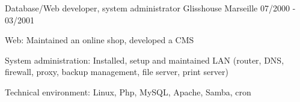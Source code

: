 \begin{cventries}
  \cventry
    {Database/Web developer, system administrator}
    {Glisshouse}
    {Marseille}
    {07/2000 - 03/2001}
    {
      \begin{cvitems}
        \item {Web: Maintained an online shop, developed a CMS}
        \item {System administration: Installed, setup and maintained LAN
            (router, DNS, firewall, proxy, backup management, file server,
            print server)}
		\item {Technical environment: Linux, Php, MySQL, Apache, Samba, cron}
      \end{cvitems}
    }

\end{cventries}


